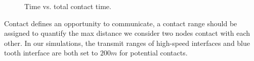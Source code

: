 \begin{figure}[!t]
\centering
{}
\caption{Time vs. total contact time.}\label{figure_contact_ct}
\end{figure}
Contact defines an opportunity to communicate, a contact range should be assigned to quantify the max distance we consider two nodes contact with each other. 
In our simulations, the transmit ranges of high-speed interfaces and blue tooth interface are both set to $200m$ for potential contacts. 

